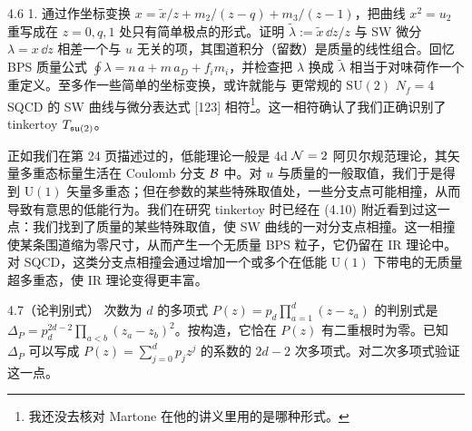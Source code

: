 
\begin{exercise}{4.6}
1. 通过作坐标变换 $x=\tilde x/z+m_2/(z-q)+m_3/(z-1)$，把曲线 $x^2=u_2$ 重写成在 $z=0,q,1$ 处只有简单极点的形式。证明 $\tilde\lambda:=\tilde x\,\dd z/z$ 与 SW 微分 $\lambda=x\,\dd z$ 相差一个与 $u$ 无关的项，其围道积分（留数）是质量的线性组合。回忆 BPS 质量公式 $\oint\lambda=n\,a+m\,a_D+f_i m_i$，并检查把 $\lambda$ 换成 $\tilde\lambda$ 相当于对味荷作一个重定义。至多作一些简单的坐标变换，或许就能与
更常规的 $\mathrm{SU}(2)$ $N_f=4$ SQCD 的 SW 曲线与微分表达式 [123] 相符\footnote{我还没去核对 Martone 在他的讲义里用的是哪种形式。}。这一相符确认了我们正确识别了 tinkertoy $T_{\mathfrak{su}(2)}$。
\end{exercise}


 正如我们在第 24 页描述过的，低能理论一般是 4d $\mathcal{N}=2$ 阿贝尔规范理论，其矢量多重态标量生活在 Coulomb 分支 $\mathcal{B}$ 中。对 $u$ 与质量的一般取值，我们于是得到 $\mathrm{U}(1)$ 矢量多重态；但在参数的某些特殊取值处，一些分支点可能相撞，从而导致有意思的低能行为。我们在研究 tinkertoy 时已经在 (4.10) 附近看到过这一点：我们找到了质量的某些特殊取值，使 SW 曲线的一对分支点相撞。这一相撞使某条围道缩为零尺寸，从而产生一个无质量 BPS 粒子，它仍留在 IR 理论中。对 SQCD，这类分支点相撞会通过增加一个或多个在低能 $\mathrm{U}(1)$ 下带电的无质量超多重态，使 IR 理论变得更丰富。

\begin{exercise}{4.7（论判别式）}
次数为 $d$ 的多项式 $P(z)=p_d\prod_{a=1}^{d}(z-z_a)$ 的判别式是 $\Delta_P=p_d^{2d-2}\prod_{a<b}(z_a-z_b)^2$。按构造，它恰在 $P(z)$ 有二重根时为零。已知 $\Delta_P$ 可以写成 $P(z)=\sum_{j=0}^{d}p_jz^j$ 的系数的 $2d-2$ 次多项式。对二次多项式验证这一点。
\end{exercise}

